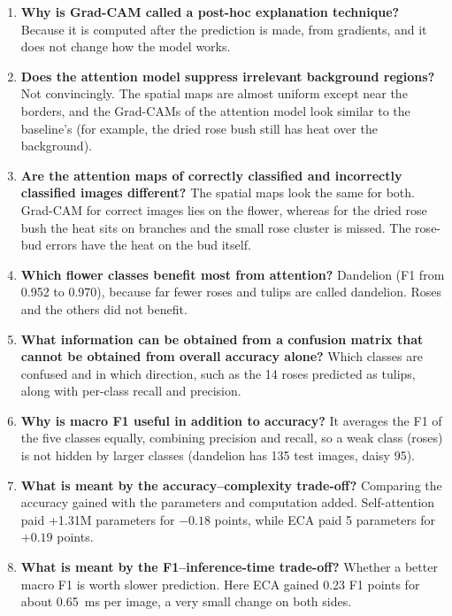 \documentclass[10pt]{article}
\begin{document}
\begin{enumerate}
\item \textbf{Why is Grad-CAM called a post-hoc explanation technique?}
Because it is computed after the prediction is made, from gradients, and it
does not change how the model works.

\item \textbf{Does the attention model suppress irrelevant background regions?}
Not convincingly. The spatial maps are almost uniform except near the
borders, and the Grad-CAMs of the attention model look similar to the
baseline's (for example, the dried rose bush still has heat over the
background).

\item \textbf{Are the attention maps of correctly classified and incorrectly classified images different?}
The spatial maps look the same for both. Grad-CAM for correct images lies
on the flower, whereas for the dried rose bush the heat sits on branches and
the small rose cluster is missed. The rose-bud errors have the heat on the
bud itself.

\item \textbf{Which flower classes benefit most from attention?}
Dandelion (F1 from 0.952 to 0.970), because far fewer roses and tulips are
called dandelion. Roses and the others did not benefit.

\item \textbf{What information can be obtained from a confusion matrix that cannot be obtained from overall accuracy alone?}
Which classes are confused and in which direction, such as the 14 roses
predicted as tulips, along with per-class recall and precision.

\item \textbf{Why is macro F1 useful in addition to accuracy?}
It averages the F1 of the five classes equally, combining precision and
recall, so a weak class (roses) is not hidden by larger classes
(dandelion has 135 test images, daisy 95).

\item \textbf{What is meant by the accuracy--complexity trade-off?}
Comparing the accuracy gained with the parameters and computation added.
Self-attention paid +1.31M parameters for $-0.18$ points, while ECA paid 5
parameters for $+0.19$ points.

\item \textbf{What is meant by the F1--inference-time trade-off?}
Whether a better macro F1 is worth slower prediction. Here ECA gained 0.23
F1 points for about 0.65~ms per image, a very small change on both sides.


\end{enumerate}
\end{document}
